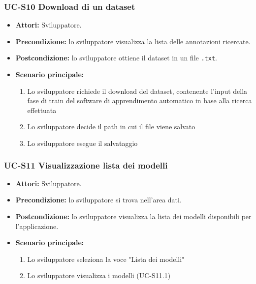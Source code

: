 	\subsubsection{UC-S10 Download di un dataset}
		\begin{itemize}
			\item \textbf{Attori:} Sviluppatore.
			\item \textbf{Precondizione:} lo sviluppatore visualizza la lista delle annotazioni ricercate.
			\item \textbf{Postcondizione:} lo sviluppatore ottiene il dataset in un file \texttt{.txt}.
			\item \textbf{Scenario principale:}
			\begin{enumerate}
				\item Lo sviluppatore richiede il download del dataset, contenente l'input della fase di train del software di apprendimento automatico in base alla ricerca effettuata
				\item Lo sviluppatore decide il path in cui il file viene salvato
				\item Lo sviluppatore esegue il salvataggio
			\end{enumerate}
		\end{itemize}
		
	\subsubsection{UC-S11 Visualizzazione lista dei modelli}
		\begin{itemize}
			\item \textbf{Attori:} Sviluppatore.
			\item \textbf{Precondizione:} lo sviluppatore si trova nell'area dati.
			\item \textbf{Postcondizione:} lo sviluppatore visualizza la lista dei modelli disponibili per l'applicazione.
			\item \textbf{Scenario principale:}
			\begin{enumerate}
					\item Lo sviluppatore seleziona la voce "Lista dei modelli"
					\item Lo sviluppatore visualizza i modelli (UC-S11.1)
				\end{enumerate}
		\end{itemize}	
		
